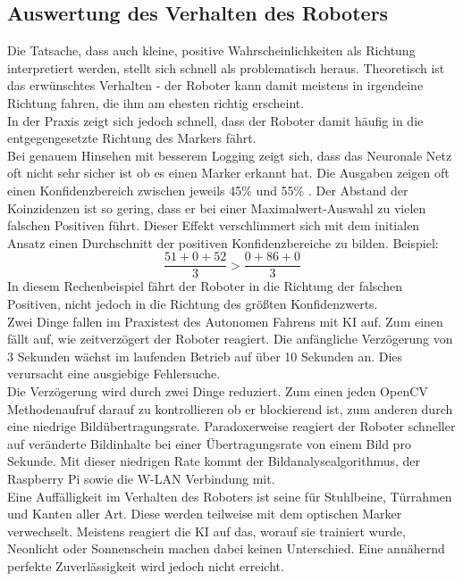 \documentclass[conference]{IEEEtran}
\begin{document}

\subsection {Auswertung des Verhalten des Roboters}	%

Die Tatsache, dass auch kleine, positive Wahrscheinlichkeiten als Richtung 
interpretiert werden, stellt sich schnell als problematisch heraus.
Theoretisch ist das erwünschtes Verhalten - der Roboter kann damit 
meistens in irgendeine Richtung fahren, die ihm am ehesten richtig 
erscheint.\\
In der Praxis zeigt sich jedoch schnell, dass der Roboter damit häufig in die 
entgegengesetzte Richtung des Markers fährt. \\

Bei genauem Hinsehen mit besserem Logging  zeigt sich, dass das Neuronale 
Netz oft nicht sehr sicher ist ob es einen Marker erkannt hat. Die Ausgaben 
zeigen oft einen Konfidenzbereich  zwischen jeweils 45\% und 55\% . Der Abstand 
der Koinzidenzen ist so gering, dass er bei einer Maximalwert-Auswahl zu 
vielen falschen Positiven führt. Dieser Effekt verschlimmert sich mit dem 
initialen Ansatz einen Durchschnitt der positiven Konfidenzbereiche zu 
bilden. Beispiel:
\[
\frac{51 + 0 +52 }{3} > \frac{0 + 86 + 0}{3}
\]
In diesem Rechenbeispiel fährt der Roboter in die Richtung der falschen 
Positiven, nicht jedoch in die Richtung des größten Konfidenzwerts.\\

Zwei Dinge fallen im Praxistest des Autonomen Fahrens mit KI auf. Zum 
einen fällt auf, wie zeitverzögert der Roboter reagiert. Die anfängliche 
Verzögerung von 3 Sekunden wächst im laufenden 
Betrieb auf über 10 Sekunden an. Dies verursacht eine ausgiebige 
Fehlersuche. \\

Die Verzögerung wird durch zwei Dinge reduziert. Zum einen 
jeden OpenCV Methodenaufruf darauf zu kontrollieren ob  er blockierend ist, 
zum anderen durch eine niedrige Bildübertragungsrate. Paradoxerweise 
reagiert der Roboter schneller auf veränderte Bildinhalte bei einer 
Übertragungsrate von einem Bild pro Sekunde. Mit dieser niedrigen Rate 
kommt der Bildanalysealgorithmus, der Raspberry Pi sowie die W-LAN 
Verbindung mit. \\
Eine Auffälligkeit im Verhalten des Roboters ist seine  
für Stuhlbeine, Türrahmen und Kanten aller Art. Diese werden teilweise mit 
dem optischen Marker verwechselt. Meistens reagiert die KI auf das, worauf 
sie trainiert wurde, Neonlicht oder Sonnenschein machen dabei keinen 
Unterschied. Eine annähernd perfekte Zuverlässigkeit wird jedoch nicht 
erreicht. 
\end{document}
